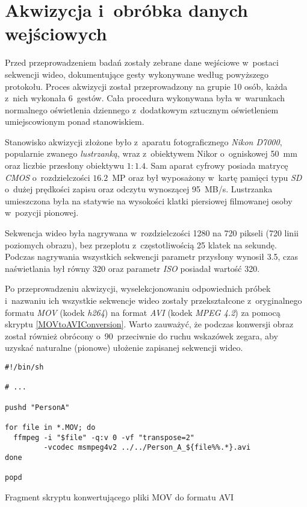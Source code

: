   \section{Akwizycja i~obróbka danych wejściowych}\label{Section_Akwizycja}

    Przed przeprowadzeniem badań zostały zebrane dane wejściowe w~postaci sekwencji wideo, dokumentujące gesty wykonywane według powyższego protokołu. Proces akwizycji został przeprowadzony na grupie 10 osób, każda z~nich wykonała 6~gestów. Cała procedura wykonywana była w~warunkach normalnego oświetlenia dziennego z~dodatkowym sztucznym oświetleniem umiejscowionym ponad stanowiskiem.

    Stanowisko akwizycji złożone było z~aparatu fotograficznego \textit{Nikon D7000}, popularnie zwanego \textit{lustrzanką}, wraz z~obiektywem Nikor o~ogniskowej 50~mm oraz liczbie przesłony obiektywu $1:1.4$. Sam aparat cyfrowy posiada matrycę \textit{CMOS} o~rozdzielczości $16.2$~MP oraz był wyposażony w~kartę pamięci typu \textit{SD} o~dużej prędkości zapisu oraz odczytu wynoszącej 95~MB/s. Lustrzanka umieszczona była na statywie na wysokości klatki piersiowej filmowanej osoby w~pozycji pionowej.

    Sekwencja wideo była nagrywana w~rozdzielczości 1280 na 720 pikseli (720 linii poziomych obrazu), bez przeplotu z~częstotliwością 25 klatek na sekundę. Podczas nagrywania wszystkich sekwencji parametr przysłony wynosił 3.5, czas naświetlania był równy 320 oraz parametr \textit{ISO} posiadał wartość 320.

    Po przeprowadzeniu akwizycji, wyselekcjonowaniu odpowiednich próbek i~nazwaniu ich wszystkie sekwencje wideo zostały przekształcone z~oryginalnego formatu \textit{MOV} (kodek \textit{h264}) na format \textit{AVI} (kodek \textit{MPEG 4.2}) za pomocą skryptu \ref{MOVtoAVIConversion}. Warto zauważyć, że podczas konwersji obraz został również obrócony o~90\degree~przeciwnie do ruchu wskazówek zegara, aby uzyskać naturalne (pionowe) ułożenie zapisanej sekwencji wideo.

      \begin{sample}[ht]
        \begin{verbatim}
#!/bin/sh

# ...

pushd "PersonA"

for file in *.MOV; do
  ffmpeg -i "$file" -q:v 0 -vf "transpose=2"
         -vcodec msmpeg4v2 ../../Person_A_${file%%.*}.avi
done

popd
        \end{verbatim}
        \caption{Fragment skryptu konwertującego pliki MOV do formatu AVI}
        \label{MOVtoAVIConversion}
      \end{sample}

